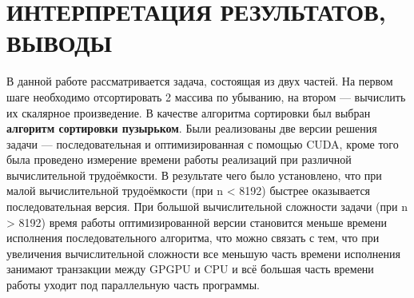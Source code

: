 \section{ИНТЕРПРЕТАЦИЯ РЕЗУЛЬТАТОВ, ВЫВОДЫ}

В данной работе рассматривается задача, состоящая из двух частей. На первом шаге необходимо отсортировать 2 массива по убыванию, на втором --- вычислить их скалярное произведение. В качестве алгоритма сортировки был выбран \textbf{алгоритм сортировки пузырьком}. Были реализованы две версии решения задачи --- последовательная и оптимизированная с помощью CUDA, кроме того была проведено измерение времени работы реализаций при различной вычислительной трудоёмкости. В результате чего было установлено, что при малой вычислительной трудоёмкости (при n < 8192) быстрее оказывается последовательная версия. При большой вычислительной сложности задачи (при n > 8192) время работы оптимизированной версии становится меньше времени исполнения последовательного алгоритма, что можно связать с тем, что при увеличения вычислительной сложности все меньшую часть времени исполнения занимают транзакции между GPGPU и CPU и всё большая часть времени работы уходит под параллельную часть программы.